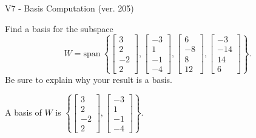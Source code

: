 \begin{exercise}
  \begin{exerciseTitle}V7 - Basis Computation (ver. 205)\end{exerciseTitle}
  \begin{exerciseStatement}
    Find a basis for the subspace 
\[W=\mathrm{span}\ \left\{\left[\begin{array}{r}
3 \\
2 \\
-2 \\
2
\end{array}\right] , \left[\begin{array}{r}
-3 \\
1 \\
-1 \\
-4
\end{array}\right] , \left[\begin{array}{r}
6 \\
-8 \\
8 \\
12
\end{array}\right] , \left[\begin{array}{r}
-3 \\
-14 \\
14 \\
6
\end{array}\right]\right\}.\]
 Be sure to explain why your result is a basis.


  \end{exerciseStatement}
  \begin{exerciseAnswer}
   A basis of \(W\) is  \(\left\{\left[\begin{array}{r}
3 \\
2 \\
-2 \\
2
\end{array}\right] , \left[\begin{array}{r}
-3 \\
1 \\
-1 \\
-4
\end{array}\right]\right\}\).
  


  \end{exerciseAnswer}
\end{exercise}